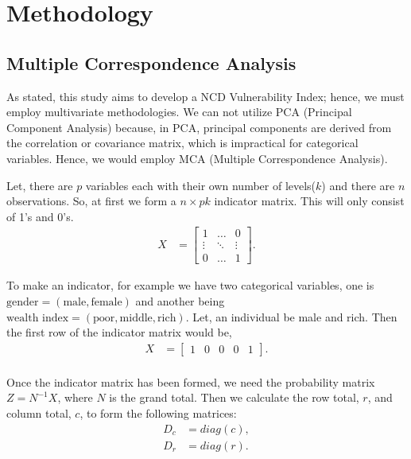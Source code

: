 \documentclass[
  12pt,
  a4paper]{article}
\begin{document}
\section{Methodology}\label{methodology}

\subsection{Multiple Correspondence Analysis}\label{multiple-correspondence-analysis}

As stated, this study aims to develop a NCD Vulnerability Index; hence, we must employ multivariate methodologies. We can not utilize PCA (Principal Component Analysis) because, in PCA, principal components are derived from the correlation or covariance matrix, which is impractical for categorical variables. Hence, we would employ MCA (Multiple Correspondence Analysis).

Let, there are \(p\) variables each with their own number of levels(\(k\)) and there are \(n\) observations. So, at first we form a \(n \times {pk}\) indicator matrix. This will only consist of 1's and 0's.
\begin{align*}
  X &= \begin{bmatrix}
    1 & \dots & 0\\
    \vdots & \ddots & \vdots\\
    0 & \dots  & 1
  \end{bmatrix}.
\end{align*}

To make an indicator, for example we have two categorical variables, one is \(\text{gender} = (\text{male}, \text{female})\) and another being \(\text{wealth index} = (\text{poor} , \text{middle}, \text{rich})\). Let, an individual be male and rich. Then the first row of the indicator matrix would be,
\[\begin{aligned}
X &= \begin{bmatrix}
          1 & 0 & 0 & 0 & 1
       \end{bmatrix}. \\
\end{aligned}\]

Once the indicator matrix has been formed, we need the probability matrix \(Z =  N^{-1}X\), where \(N\) is the grand total. Then we calculate the row total, \(r\), and column total, \(c\), to form the following matrices:
\[\begin{aligned} D_{c} &= diag(c),\\
D_{r} &= diag(r). \end{aligned} \]
\end{document}
